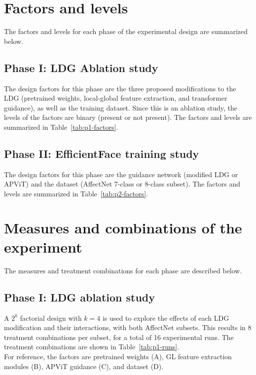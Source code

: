 \section{Factors and levels}
The factors and levels for each phase of the experimental design are summarized below.

\subsection{Phase I: LDG Ablation study}
The design factors for this phase are the three proposed modifications to the LDG (pretrained weights, local-global feature extraction, and transformer guidance), as well as the training dataset. Since this is an ablation study, the levels of the factors are binary (present or not present). The factors and levels are summarized in Table~\ref{tab:p1-factors}.



\subsection{Phase II: EfficientFace training study}
The design factors for this phase are the guidance network (modified LDG or APViT) and the dataset (AffectNet 7-class or 8-class subset). The factors and levels are summarized in Table~\ref{tab:p2-factors}.



\section{Measures and combinations of the experiment}
The measures and treatment combinations for each phase are described below.

\subsection{Phase I: LDG ablation study}
A $2^k$ factorial design with $k=4$ is used to explore the effects of each LDG modification and their interactions, with both AffectNet subsets. This results in 8 treatment combinations per subset, for a total of 16 experimental runs. The treatment combinations are shown in Table~\ref{tab:p1-runs}.\\
For reference, the factors are pretrained weights (A), GL feature extraction modules (B), APViT guidance (C), and dataset (D).



